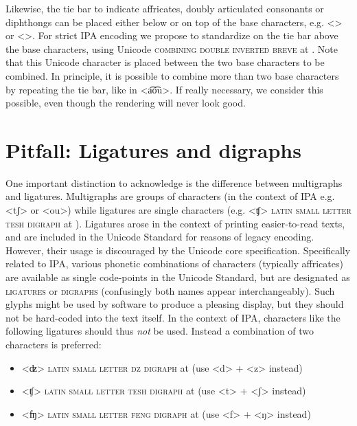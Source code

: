 Likewise, the tie bar to indicate affricates, doubly articulated consonants or
diphthongs can be placed either below or on top of the base characters, e.g.
<> or <>. For strict IPA encoding we propose to standardize on the tie bar
above the base characters, using Unicode \textsc{combining double inverted
breve} at . Note that this Unicode character is placed between the two 
base characters to be combined. In principle, it is possible to combine more 
than two base characters by repeating the tie bar, like in <a͡o͡u>. If really
necessary, we consider this possible, even though the rendering will never look 
good.


\section{Pitfall: Ligatures and digraphs}
\label{pitfall-ligatures-digraphs}     
       
One important distinction to acknowledge is the difference between multigraphs
and ligatures. Multigraphs are groups of characters (in the context of IPA e.g.
<tʃ> or <ou>) while ligatures are single characters (e.g. <ʧ> \textsc{latin
small letter tesh digraph} at ). Ligatures arose in the context of
printing easier-to-read texts, and are included in the Unicode Standard for
reasons of legacy encoding. However, their usage is discouraged by the Unicode
core specification. Specifically related to IPA, various phonetic combinations
of characters (typically affricates) are available as single code-points in the
Unicode Standard, but are designated as \textsc{ligatures} or \textsc{digraphs}
(confusingly both names appear interchangeably). Such glyphs might be used by
software to produce a pleasing display, but they should not be hard-coded into
the text itself. In the context of IPA, characters like the following ligatures
should thus \emph{not} be used. Instead a combination of two characters is
preferred:
      
\begin{itemize} 
	\item <ʣ> \textsc{latin small letter dz digraph} at  (use <d> + <z> instead) 
	\item <ʧ> \textsc{latin small letter tesh digraph} at  (use <t> + <ʃ> instead) 
	\item <ʩ> \textsc{latin small letter feng digraph} at  (use <f> + <ŋ> instead) 
\end{itemize}

